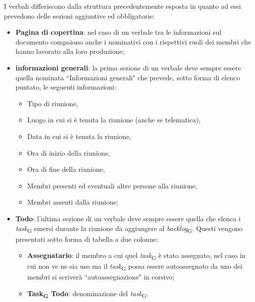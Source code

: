 \label{sec: struttura verbali}
I verbali differiscono dalla struttura precedentemente esposta in quanto ad essi prevedono delle sezioni aggiuntive ed obbligatorie:
\begin{itemize}
    \item \textbf{Pagina di copertina}: nel caso di un verbale tra le informazioni sul documento compaiono anche i nominativi con i rispettivi ruoli dei membri che hanno lavorato alla loro produzione;
    \item \textbf{informazioni generali}: la prima sezione di un verbale deve sempre essere quella nominata ``Informazioni generali" che prevede, sotto forma di elenco puntato, le seguenti informazioni:
        \begin{itemize}
            \item Tipo di riunione,
            \item Luogo in cui si è tenuta la riunione (anche se telematica),
            \item Data in cui si è tenuta la riunione,
            \item Ora di inizio della riunione,
            \item Ora di fine della riunione,
            \item Membri presenti ed eventuali altre persone alla riunione,
            \item Membri assenti dalla riunione;
        \end{itemize}
     \item \textbf{Todo}: l'ultima sezione di un verbale deve sempre essere quella che elenca i \textit{task}\textsubscript{G} emersi durante la riunione da aggiungere al \textit{backlog}\textsubscript{G}. Questi vengono presentati sotto forma di tabella a due colonne:
     \begin{itemize}
         \item \textbf{Assegnatario}: il membro a cui quel \textit{task}\textsubscript{G} è stato assegnato, nel caso in cui non ve ne sia uso ma il \textit{task}\textsubscript{G} possa essere autoassegnato da uno dei membri si scriverà ``autoassegnazione" in corsivo;
         \item \textbf{Task\textsubscript{G} Todo}: denominazione del \textit{task}\textsubscript{G}.
     \end{itemize}
     
\end{itemize}

